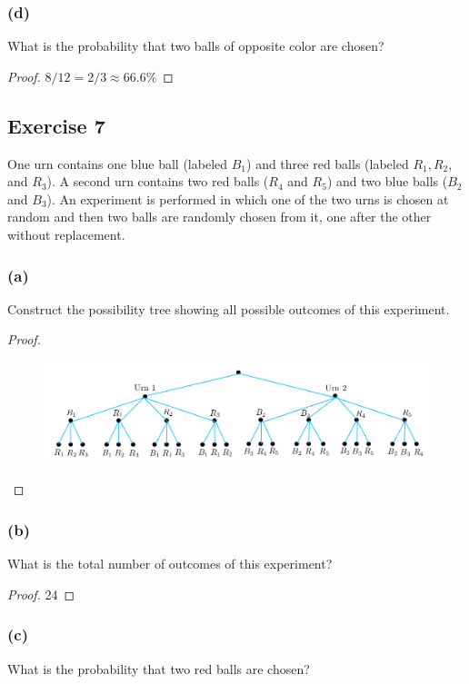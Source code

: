 \documentclass[14pt]{extarticle}
\begin{document}
\subsubsection{(d)}
What is the probability that two balls of opposite color are chosen?

\begin{proof}
     \(8/12 = 2/3 \approx 66.6\%\)
\end{proof}

\subsection{Exercise 7}
One urn contains one blue ball (labeled \(B_1\)) and three red balls (labeled \(R_1, R_2\), and \(R_3\)). A second urn
contains two red balls (\(R_4\) and \(R_5\)) and two blue balls (\(B_2\) and \(B_3\)). An experiment is performed in
which one of the two urns is chosen at random and then two balls are randomly chosen from it, one after the other
without replacement.

\subsubsection{(a)}
Construct the possibility tree showing all possible outcomes of this experiment.

\begin{proof}
     \begin{figure}[ht!]
          \centering
          \includegraphics[scale=0.5]{../images/9.2.7.a.png}
     \end{figure}
\end{proof}

\subsubsection{(b)}
What is the total number of outcomes of this experiment?

\begin{proof}
     24
\end{proof}

\subsubsection{(c)}
What is the probability that two red balls are chosen?
\end{document}
